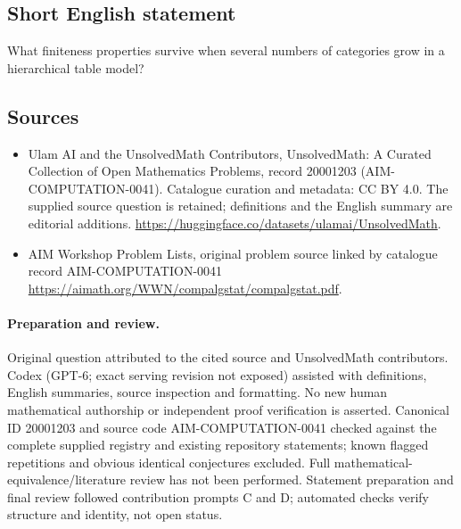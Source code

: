 \documentclass[11pt]{article}
\begin{document}
\subsection{Short English statement}
What finiteness properties survive when several numbers of categories grow in a hierarchical table model?
\subsection{Sources}
\begin{itemize}
\item[\hypertarget{source:20001203:1}{S1}] Ulam AI and the UnsolvedMath Contributors, UnsolvedMath: A Curated Collection of Open Mathematics Problems, record 20001203 (AIM-COMPUTATION-0041). Catalogue curation and metadata: CC BY 4.0. The supplied source question is retained; definitions and the English summary are editorial additions.
\url{https://huggingface.co/datasets/ulamai/UnsolvedMath}.
\item[\hypertarget{source:20001203:2}{S2}] AIM Workshop Problem Lists, original problem source linked by catalogue record AIM-COMPUTATION-0041
\url{https://aimath.org/WWN/compalgstat/compalgstat.pdf}.
\end{itemize}
\paragraph{Preparation and review.}
Original question attributed to the cited source and UnsolvedMath contributors. Codex (GPT-6; exact serving revision not exposed) assisted with definitions, English summaries, source inspection and formatting. No new human mathematical authorship or independent proof verification is asserted. Canonical ID 20001203 and source code AIM-COMPUTATION-0041 checked against the complete supplied registry and existing repository statements; known flagged repetitions and obvious identical conjectures excluded. Full mathematical-equivalence/literature review has not been performed. Statement preparation and final review followed contribution prompts C and D; automated checks verify structure and identity, not open status.
\label{end:20001203}
\end{document}
